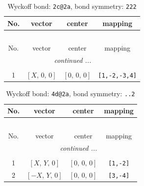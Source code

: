 \documentclass[fleqn,8pt]{jsarticle}
\begin{document}
\renewcommand{\arraystretch}{1.2}
\begin{longtable}{cccc}
\caption{Wyckoff bond: {\tt 2c@2a}, bond symmetry: {\tt 222}}
 \\
 \hline \hline
No. & vector & center & mapping \\ \hline \endfirsthead

\multicolumn{3}{l}{\tablename\ \thetable{}} \\
 \hline \hline
No. & vector & center & mapping \\ \hline \endhead

 \hline \hline
\multicolumn{3}{r}{\footnotesize\it continued ...} \\ \endfoot

 \hline \hline
\multicolumn{3}{r}{} \\ \endlastfoot

1 & $\left[ X,\, 0,\, 0 \right]$ & $\left[ 0,\, 0,\, 0 \right]$ & {\tt [1,-2,-3,4]} \\
\end{longtable}
\renewcommand{\arraystretch}{1.2}
\begin{longtable}{cccc}
\caption{Wyckoff bond: {\tt 4d@2a}, bond symmetry: {\tt ..2}}
 \\
 \hline \hline
No. & vector & center & mapping \\ \hline \endfirsthead

\multicolumn{3}{l}{\tablename\ \thetable{}} \\
 \hline \hline
No. & vector & center & mapping \\ \hline \endhead

 \hline \hline
\multicolumn{3}{r}{\footnotesize\it continued ...} \\ \endfoot

 \hline \hline
\multicolumn{3}{r}{} \\ \endlastfoot

1 & $\left[ X,\, Y,\, 0 \right]$ & $\left[ 0,\, 0,\, 0 \right]$ & {\tt [1,-2]} \\ \hline
2 & $\left[ - X,\, Y,\, 0 \right]$ & $\left[ 0,\, 0,\, 0 \right]$ & {\tt [3,-4]} \\
\end{longtable}
\renewcommand{\arraystretch}{1.2}
\end{document}
